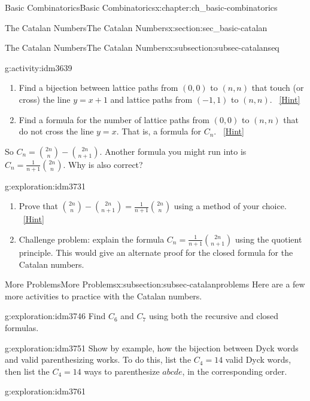 \documentclass[oneside,10pt,]{book}
\numberwithin{equation}{chapter}
\begin{document}
\begin{chapterptx}{Basic Combinatorics}{}{Basic Combinatorics}{}{}{x:chapter:ch_basic-combinatorics}
\begin{sectionptx}{The Catalan Numbers}{}{The Catalan Numbers}{}{}{x:section:sec_basic-catalan}
\begin{subsectionptx}{The Catalan Numbers}{}{The Catalan Numbers}{}{}{x:subsection:subsec-catalanseq}
\begin{activity}{}{g:activity:idm3639}
\begin{enumerate}[font=\bfseries,label=(\alph*),ref=\alph*]
\item{}Find a bijection between lattice paths from \((0,0)\) to \((n,n)\) that touch (or cross) the line \(y=x+1\) and lattice paths from \((-1,1)\) to \((n,n)\).%
\qquad~\hfill{\tiny\hyperlink{g:hint:idm3677-back}{[Hint]}}\item{}Find a formula for the number of lattice paths from \((0,0)\) to \((n,n)\) that do not cross the line \(y=x\). That is, a formula for \(C_n\).%
\qquad~\hfill{\tiny\hyperlink{g:hint:idm3722-back}{[Hint]}}\end{enumerate}
\end{activity}
So \(C_n = \binom{2n}{n} - \binom{2n}{n+1}\).  Another formula you might run into is \(C_n = \frac{1}{n+1}\binom{2n}{n}\).  Why is also correct?%
\begin{exploration}{}{g:exploration:idm3731}%
\begin{enumerate}[font=\bfseries,label=(\alph*),ref=\alph*]
\item{}Prove that \(\binom{2n}{n} - \binom{2n}{n+1} = \frac{1}{n+1}\binom{2n}{n}\) using a method of your choice.%
\qquad~\hfill{\tiny\hyperlink{g:hint:idm3736-back}{[Hint]}}\item{}Challenge problem: explain the formula \(C_n = \frac{1}{n+1}\binom{2n}{n+1}\) using the quotient principle.  This would give an alternate proof for the closed formula for the Catalan numbers.%
\end{enumerate}
\end{exploration}
\end{subsectionptx}
%
%
\typeout{************************************************}
\typeout{************************************************}
%
\begin{subsectionptx}{More Problems}{}{More Problems}{}{}{x:subsection:subsec-catalanproblems}
Here are a few more activities to practice with the Catalan numbers.%
\begin{exploration}{}{g:exploration:idm3746}%
Find \(C_6\) and \(C_7\) using both the recursive and closed formulas.%
\end{exploration}
\begin{exploration}{}{g:exploration:idm3751}%
Show by example, how the bijection between Dyck words and valid parenthesizing works.  To do this, list the \(C_4 = 14\) valid Dyck words, then list the \(C_4 = 14\) ways to parenthesize \(abcde\), in the corresponding order.%
\end{exploration}
\begin{exploration}{}{g:exploration:idm3761}%

\end{exploration}
\end{subsectionptx}
\end{sectionptx}
\end{chapterptx}
\end{document}
